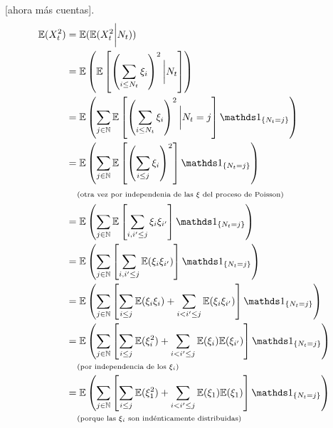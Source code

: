 [ahora más cuentas]. 
\begin{align}
    \E(X_t^2)   &=  \E(\E(X_t^2 \bigg| N_t))                                                                                                                                \\
                &=  \E\left(\E\left[ \left(\sum_{i \leq N_t} \xi_i \right)^2 \bigg| N_t\right] \right)                                                                      \\
                &=  \E\left(\sum_{j \in \N} \E\left[ \left(\sum_{i \leq N_t} \xi_i \right)^2 \bigg| N_t = j\right] \indic_{\{ N_t = j\}} \right)                            \\
                &=  \E\left(\sum_{j \in \N} \E\left[ \left(\sum_{i \leq j} \xi_i \right)^2 \right] \indic_{\{ N_t = j\}} \right)                                            \\
                &\comment{otra vez por independenia de las $\xi$ del proceso de Poisson}                                                                                    \\
                &=  \E\left(\sum_{j \in \N} \E\left[ \sum_{i, i' \leq j} \xi_i \xi_{i'} \right] \indic_{\{ N_t = j\}} \right)                                               \\
                &=  \E\left(\sum_{j \in \N} \left[ \sum_{i, i' \leq j} \E(\xi_i \xi_{i'}) \right] \indic_{\{ N_t = j\}} \right)                                             \\
                &=  \E\left(\sum_{j \in \N} \left[ \sum_{i \leq j} \E(\xi_i \xi_i) + \sum_{i < i' \leq j} \E(\xi_i \xi_{i'}) \right] \indic_{\{ N_t = j\}} \right)          \\
                &=  \E\left(\sum_{j \in \N} \left[ \sum_{i \leq j} \E(\xi_i^2) + \sum_{i < i' \leq j} \E(\xi_i) \E(\xi_{i'}) \right] \indic_{\{ N_t = j\}} \right)          \\
                &\comment{por independencia de los $\xi_i$}                                                                                                                 \\
                &=  \E\left(\sum_{j \in \N} \left[ \sum_{i \leq j} \E(\xi_1^2) + \sum_{i < i' \leq j} \E(\xi_1) \E(\xi_1) \right] \indic_{\{ N_t = j\}} \right)             \\
                &\comment{porque las $\xi_i$ son indénticamente distribuidas}                                                                                               \\

\end{align}
